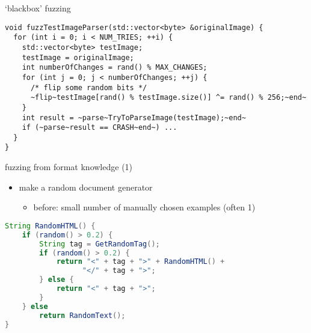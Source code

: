 \begin{frame}[fragile,label=bbFuzz]{`blackbox' fuzzing}
\begin{lstlisting}
void fuzzTestImageParser(std::vector<byte> &originalImage) {
  for (int i = 0; i < NUM_TRIES; ++i) {
    std::vector<byte> testImage;
    testImage = originalImage;
    int numberOfChanges = rand() % MAX_CHANGES;
    for (int j = 0; j < numberOfChanges; ++j) {
      /* flip some random bits */
      ~flip~testImage[rand() % testImage.size()] ^= rand() % 256;~end~
    }
    int result = ~parse~TryToParseImage(testImage);~end~
    if (~parse~result == CRASH~end~) ...
  }
}
\end{lstlisting}
\end{frame}

\begin{frame}[fragile,label=formatKnow]{fuzzing from format knowledge (1)}
    \begin{itemize}
        \item make a random document generator
            \begin{itemize}
                \item before: small number of manually chosen examples (often 1)
            \end{itemize}
    \end{itemize}
    \begin{lstlisting}[language=Java, style=small]
String RandomHTML() {
    if (random() > 0.2) {
        String tag = GetRandomTag();
        if (random() > 0.2) {
            return "<" + tag + ">" + RandomHTML() +
                  "</" + tag + ">";
        } else {
            return "<" + tag + ">";
        }
    } else
        return RandomText();
}
\end{lstlisting}
\end{frame}

